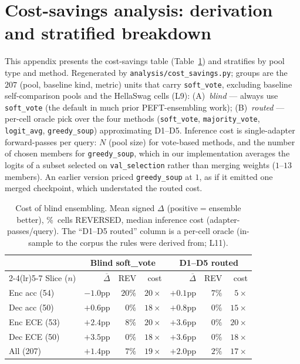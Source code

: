 \documentclass[11pt]{article}
\begin{document}
\section{Cost-savings analysis: derivation and stratified breakdown}\label{app:cost}

{\sloppy This appendix presents the cost-savings table (Table~\ref{tab:cost}) and stratifies by pool type and method. Regenerated by \texttt{analysis/cost\_savings.py}; groups are the $207$ (pool, baseline kind, metric) units that carry \texttt{soft\_vote}, excluding baseline self-comparison pools and the HellaSwag cells (L9): (A)~\emph{blind} --- always use \texttt{soft\_vote} (the default in much prior PEFT-ensembling work); (B)~\emph{routed} --- per-cell oracle pick over the four methods (\texttt{soft\_vote}, \texttt{majority\_vote}, \texttt{logit\_avg}, \texttt{greedy\_soup}) approximating D1--D5. Inference cost is single-adapter forward-passes per query: $N$ (pool size) for vote-based methods, and the number of chosen members for \texttt{greedy\_soup}, which in our implementation averages the logits of a subset selected on \texttt{val\_selection} rather than merging weights ($1$--$13$ members). An earlier version priced \texttt{greedy\_soup} at $1$, as if it emitted one merged checkpoint, which understated the routed cost.\par}

\begin{table}[h]
\centering
\caption{Cost of blind ensembling. Mean signed $\Delta$ (positive$=$ensemble better), \%~cells REVERSED, median inference cost (adapter-passes/query). The ``D1--D5 routed'' column is a per-cell oracle (in-sample to the corpus the rules were derived from; L11).}
\label{tab:cost}
\small
\setlength{\tabcolsep}{3pt}
\begin{tabular}{@{}lrrrrrr@{}}
\toprule
 & \multicolumn{3}{c}{Blind soft\_vote} & \multicolumn{3}{c}{D1--D5 routed} \\
\cmidrule(lr){2-4}\cmidrule(lr){5-7}
Slice ($n$) & $\overline{\Delta}$ & REV & cost & $\overline{\Delta}$ & REV & cost \\
\midrule
Enc acc (54)   & $-1.0$pp & $20\%$ & $20{\times}$ & $+0.1$pp & $7\%$ & $5{\times}$ \\
Dec acc (50)   & $+0.6$pp & $0\%$ & $18{\times}$ & $+0.8$pp & $0\%$ & $15{\times}$ \\
Enc ECE (53)   & $+2.4$pp & $8\%$ & $20{\times}$ & $+3.6$pp & $0\%$ & $20{\times}$ \\
Dec ECE (50)   & $+3.5$pp & $0\%$ & $18{\times}$ & $+3.6$pp & $0\%$ & $18{\times}$ \\
\midrule
All (207)      & $+1.4$pp & $7\%$ & $19{\times}$ & $+2.0$pp & $2\%$ & $17{\times}$ \\
\bottomrule
\end{tabular}
\end{table}
\end{document}
